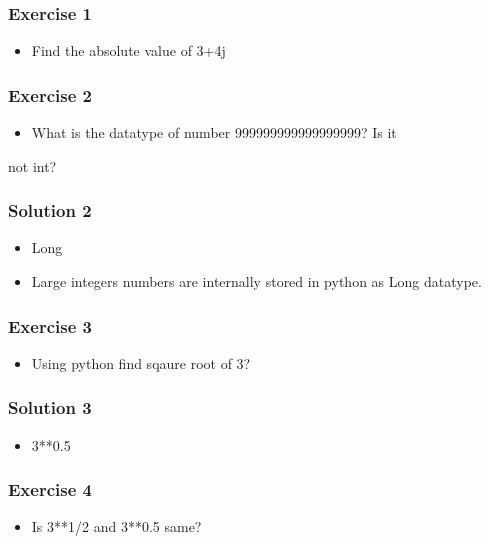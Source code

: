 \documentclass[presentation]{beamer}
\begin{document}
\begin{frame}
\frametitle{Exercise 1}
\label{sec-4}


\begin{itemize}
\item Find the absolute value of 3+4j
\end{itemize}
\end{frame}
\begin{frame}
\frametitle{Exercise 2}
\label{sec-5}


\begin{itemize}
\item What is the datatype of number 999999999999999999? Is it
\end{itemize}
not int?
\end{frame}
\begin{frame}
\frametitle{Solution 2}
\label{sec-6}


\begin{itemize}
\item Long
\item Large integers numbers are internally stored in python as Long
    datatype.
\end{itemize}
\end{frame}
\begin{frame}
\frametitle{Exercise 3}
\label{sec-7}


\begin{itemize}
\item Using python find sqaure root of 3?
\end{itemize}
\end{frame}
\begin{frame}
\frametitle{Solution 3}
\label{sec-8}



\begin{itemize}
\item 3**0.5
\end{itemize}
\end{frame}
\begin{frame}
\frametitle{Exercise 4}
\label{sec-9}


\begin{itemize}
\item Is 3**1/2 and 3**0.5 same?
\end{itemize}
\end{frame}
\end{document}
